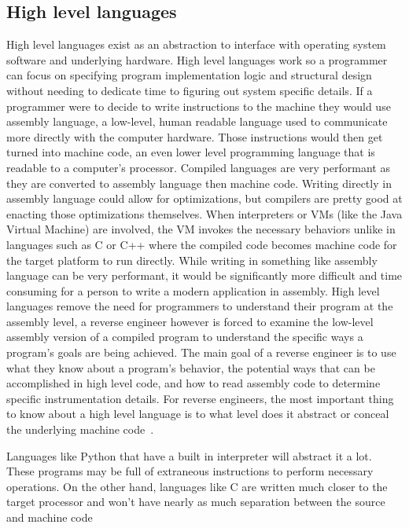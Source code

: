 \subsection{High level languages}
High level languages exist as an abstraction to interface with operating system software and underlying hardware.
High level languages work so a programmer can focus on specifying program implementation logic and structural design without needing to dedicate time to figuring out system specific details. If a programmer were to decide to write instructions to the machine they would use assembly language, a low-level, human readable language used to communicate more directly with the computer hardware. Those instructions would then get turned into machine code, an even lower level programming language that is readable to a computer's processor.
Compiled languages are very performant as they are converted to assembly language then machine code. Writing directly in assembly language could allow for optimizations, but compilers are pretty good at enacting those optimizations themselves. When interpreters or VMs (like the Java Virtual Machine) are involved, the VM invokes the necessary behaviors unlike in languages such as C or C++ where the compiled code becomes machine code for the target platform to run directly. 
While writing in something like assembly language can be very performant, it would be significantly more difficult and time consuming for a person to write a modern application in assembly.
High level languages remove the need for programmers to understand their program at the assembly level, a reverse engineer however is forced to examine the low-level assembly version of a compiled program to understand the specific ways a program's goals are being achieved.
The main goal of a reverse engineer is to use what they know about a program's behavior, the potential ways that can be accomplished in high level code, and how to read assembly code to determine specific instrumentation details.
For reverse engineers, the most important thing to know about a high level language is to what level does it abstract or conceal the underlying machine code~\cite{Reversing}. 

Languages like Python that have a built in interpreter will abstract it a lot. 
These programs may be full of extraneous instructions to perform necessary operations. On the other hand, languages like C are written much closer to the target processor and won’t have nearly as much separation between the source and machine code

